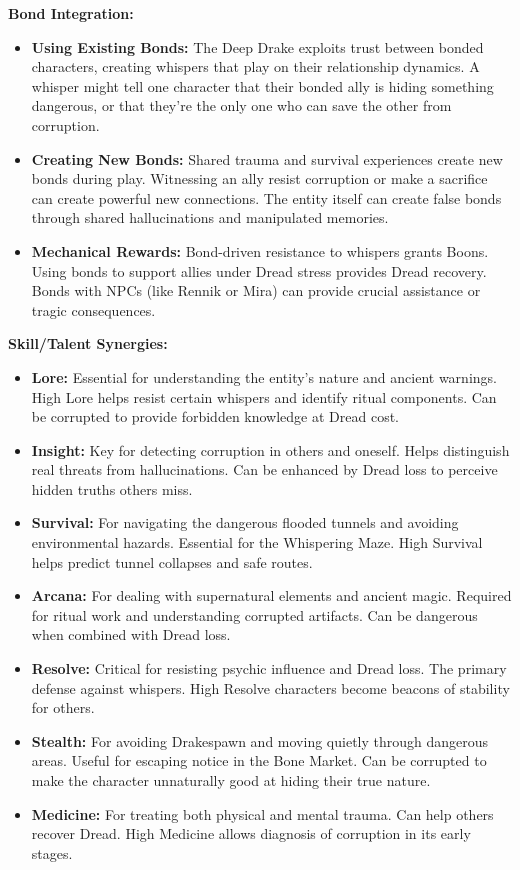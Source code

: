 \documentclass[11pt]{article}
\begin{document}
\textbf{Bond Integration:}
\begin{itemize}
\item \textbf{Using Existing Bonds:} The Deep Drake exploits trust between bonded characters, creating whispers that play on their relationship dynamics. A whisper might tell one character that their bonded ally is hiding something dangerous, or that they're the only one who can save the other from corruption.
\item \textbf{Creating New Bonds:} Shared trauma and survival experiences create new bonds during play. Witnessing an ally resist corruption or make a sacrifice can create powerful new connections. The entity itself can create false bonds through shared hallucinations and manipulated memories.
\item \textbf{Mechanical Rewards:} Bond-driven resistance to whispers grants Boons. Using bonds to support allies under Dread stress provides Dread recovery. Bonds with NPCs (like Rennik or Mira) can provide crucial assistance or tragic consequences.
\end{itemize}

\textbf{Skill/Talent Synergies:}
\begin{itemize}
\item \textbf{Lore:} Essential for understanding the entity's nature and ancient warnings. High Lore helps resist certain whispers and identify ritual components. Can be corrupted to provide forbidden knowledge at Dread cost.
\item \textbf{Insight:} Key for detecting corruption in others and oneself. Helps distinguish real threats from hallucinations. Can be enhanced by Dread loss to perceive hidden truths others miss.
\item \textbf{Survival:} For navigating the dangerous flooded tunnels and avoiding environmental hazards. Essential for the Whispering Maze. High Survival helps predict tunnel collapses and safe routes.
\item \textbf{Arcana:} For dealing with supernatural elements and ancient magic. Required for ritual work and understanding corrupted artifacts. Can be dangerous when combined with Dread loss.
\item \textbf{Resolve:} Critical for resisting psychic influence and Dread loss. The primary defense against whispers. High Resolve characters become beacons of stability for others.
\item \textbf{Stealth:} For avoiding Drakespawn and moving quietly through dangerous areas. Useful for escaping notice in the Bone Market. Can be corrupted to make the character unnaturally good at hiding their true nature.
\item \textbf{Medicine:} For treating both physical and mental trauma. Can help others recover Dread. High Medicine allows diagnosis of corruption in its early stages.
\end{itemize}
\end{document}
